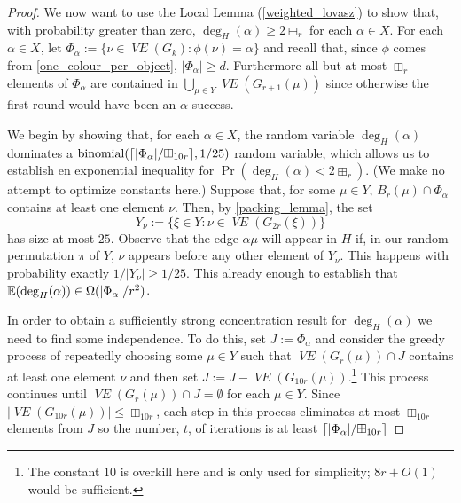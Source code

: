 \documentclass{patmorin}
\newcommand{\vol}[1]{\boxplus_{#1}}
\DeclareMathOperator{\binomial}{binomial}
\DeclareMathOperator{\VE}{\mathit{VE}}
\begin{document}
\begin{proof}
  We now want to use the Local Lemma (\cref{weighted_lovasz}) to show that, with probability greater than zero, $\deg_H(\alpha)\ge 2\vol{r}$ for each $\alpha\in X$.
  For each $\alpha\in X$, let $\Phi_\alpha:=\{\nu\in\VE(G_k):\phi(\nu)=\alpha\}$ and recall that, since $\phi$ comes from \cref{one_colour_per_object}, $|\Phi_\alpha| \ge d$.  Furthermore all but at most $\vol{r}$ elements of $\Phi_\alpha$ are contained in $\bigcup_{\mu\in Y}\VE(G_{r+1}(\mu))$ since otherwise the first round would have been an $\alpha$-success.\todo{Explain more or redefine $\Phi_\alpha$ as $\Phi_\alpha\cap (\bigcup_{\mu\in Y}\VE(G_{r+1}(\mu)))$)}

  We begin by showing that, for each $\alpha\in X$, the random variable $\deg_H(\alpha)$ dominates a $\binomial(\ceil{|\Phi_\alpha|/\vol{10r}},1/25)$ random variable, which allows us to establish en exponential inequality for $\Pr(\deg_H(\alpha) < 2\vol{r})$.  (We make no attempt to optimize constants here.)  Suppose that, for some $\mu\in Y$, $B_r(\mu)\cap \Phi_\alpha$ contains at least one element $\nu$. Then, by \cref{packing_lemma}, the set
  \[
     Y_\nu := \{\xi\in Y:\nu\in\VE(G_{2r}(\xi))\}
  \]
  has size at most $25$. Observe that the edge $\alpha\mu$ will appear in $H$ if, in our random permutation $\pi$ of $Y$, $\nu$ appears before any other element of $Y_\nu$.  This happens with probability exactly $1/|Y_\nu|\ge 1/25$. This already enough to establish that $\mathbb{E}(\deg_H(\alpha)) \in \Omega(|\Phi_\alpha|/r^2)$.

  In order to obtain a sufficiently strong concentration result for $\deg_H(\alpha)$ we need to find some independence.  To do this, set $J:=\Phi_\alpha$ and consider the greedy process of repeatedly choosing some $\mu\in Y$ such that $\VE(G_r(\mu))\cap J$ contains at least one element $\nu$ and then set $J:=J-\VE(G_{10r}(\mu))$.\footnote{The constant $10$ is overkill here and is only used for simplicity; $8r+O(1)$ would be sufficient.}  This process continues until $\VE(G_r(\mu))\cap J=\emptyset$ for each $\mu\in Y$. Since $|\VE(G_{10r}(\mu))|\le \vol{10r}$, each step in this process eliminates at most $\vol{10r}$ elements from $J$ so the number, $t$, of iterations is at least $\ceil{|\Phi_\alpha|/\vol{10r}}$


\end{proof}
\end{document}
